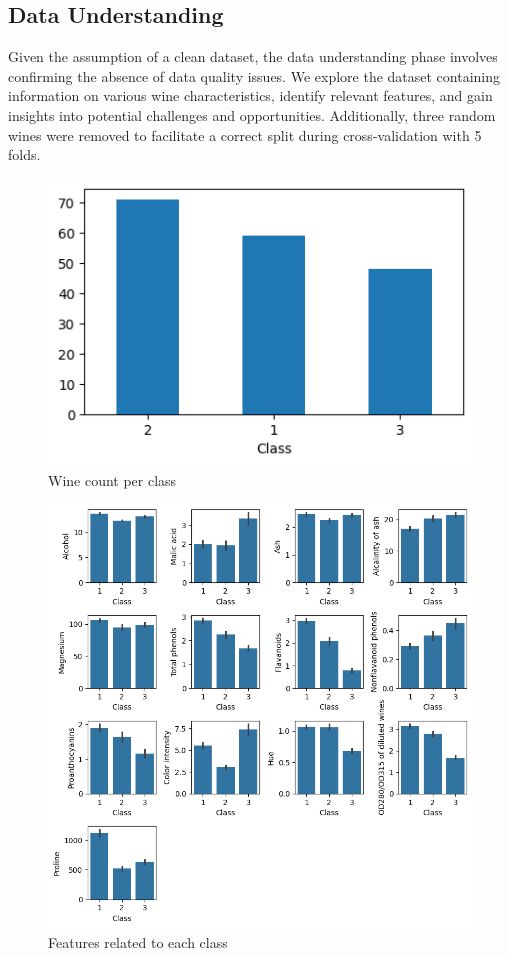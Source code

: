 \documentclass[twocolumn]{article}
\begin{document}
	\subsection{Data Understanding}
	Given the assumption of a clean dataset, the data understanding phase involves
	confirming the absence of data quality issues. We explore the dataset
	containing information on various wine characteristics, identify relevant features,
	and gain insights into potential challenges and opportunities. Additionally,
	three random wines were removed to facilitate a correct split during cross-validation
	with 5 folds.

	\begin{figure}[H] %
		\centering
		\includegraphics[width=1\linewidth]{winePerClass.png}
		\caption{Wine count per class}
		\label{fig:wine-count}
	\end{figure}

	\begin{figure}[H]
		\centering
		\includegraphics[width=1\linewidth]{Feature vs Class.png}
		\caption{Features related to each class}
		\label{fig:features-class}
	\end{figure}
\end{document}

